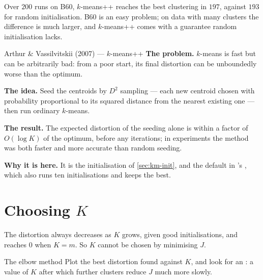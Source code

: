Over $200$ runs on B60, $k$-means++ reaches the best clustering in $197$, against
$193$ for random initialisation. B60 is an easy problem; on data with many
clusters the difference is much larger, and $k$-means++ comes with a guarantee
random initialisation lacks.

\begin{researchspotlight}{Arthur \& Vassilvitskii (2007) --- $k$-means++}
\textbf{The problem.} $k$-means is fast but can be arbitrarily bad: from a poor
start, its final distortion can be unboundedly worse than the optimum.

\textbf{The idea.} Seed the centroids by $D^2$ sampling --- each new centroid
chosen with probability proportional to its squared distance from the nearest
existing one --- then run ordinary $k$-means.

\textbf{The result.} The expected distortion of the seeding alone is within a
factor of $O(\log K)$ of the optimum, before any iterations; in experiments the
method was both faster and more accurate than random seeding.

\textbf{Why it is here.} It is the initialisation of \cref{sec:km-init}, and the
default in 's , which also runs ten
initialisations and keeps the best.
\parencite{arthur2007}
\end{researchspotlight}

\section{Choosing \texorpdfstring{$K$}{K}}
\label{sec:choose-k}

The distortion always decreases as $K$ grows, given good initialisations, and
reaches $0$ when $K = m$. So $K$ cannot be chosen by minimising $J$.

\begin{defbox}{The elbow method}
Plot the best distortion found against $K$, and look for an : a value
of $K$ after which further clusters reduce $J$ much more slowly.
\end{defbox}

